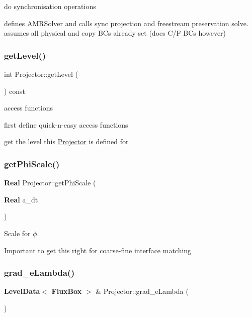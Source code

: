 do synchronisation operations 

defines A\+M\+R\+Solver and calls sync projection and freestream preservation solve. assumes all physical and copy BC\textquotesingle{}s already set (does C/F BC\textquotesingle{}s however) \mbox{\label{class_projector_aa7f8e7fa6873b1972dbaf7458f3af71d}} 
\subsubsection{\texorpdfstring{get\+Level()}{getLevel()}}
{\footnotesize\ttfamily int Projector\+::get\+Level (\begin{DoxyParamCaption}{ }\end{DoxyParamCaption}) const}



access functions 

first define quick-\/n-\/easy access functions

get the level this \hyperlink{class_projector}{Projector} is defined for \mbox{\label{class_projector_a87058c308a90f992ce88a668a65a1a79}} 
\subsubsection{\texorpdfstring{get\+Phi\+Scale()}{getPhiScale()}}
{\footnotesize\ttfamily \textbf{ Real} Projector\+::get\+Phi\+Scale (\begin{DoxyParamCaption}\item[{\textbf{ Real}}]{a\+\_\+dt }\end{DoxyParamCaption})}



Scale for $ \phi $. 

Important to get this right for coarse-\/fine interface matching \mbox{\label{class_projector_a63fba24063458770cdc25a630fad02f2}} 
\subsubsection{\texorpdfstring{grad\+\_\+e\+Lambda()}{grad\_eLambda()}}
{\footnotesize\ttfamily \textbf{ Level\+Data}$<$ \textbf{ Flux\+Box} $>$ \& Projector\+::grad\+\_\+e\+Lambda (\begin{DoxyParamCaption}{ }\end{DoxyParamCaption})}



